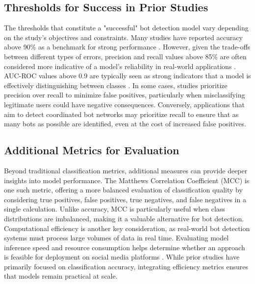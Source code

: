 \documentclass[10pt,twocolumn]{article}
\begin{document}
\subsection{Thresholds for Success in Prior Studies}
The thresholds that constitute a "successful" bot detection model vary depending on the study's objectives and constraints. Many studies have reported accuracy above 90\% as a benchmark for strong performance \cite{Akyon2019}. However, given the trade-offs between different types of errors, precision and recall values above 85\% are often considered more indicative of a model's reliability in real-world applications \cite{Grimme2018}. AUC-ROC values above 0.9 are typically seen as strong indicators that a model is effectively distinguishing between classes \cite{Orabi2020}. In some cases, studies prioritize precision over recall to minimize false positives, particularly when misclassifying legitimate users could have negative consequences. Conversely, applications that aim to detect coordinated bot networks may prioritize recall to ensure that as many bots as possible are identified, even at the cost of increased false positives.

\subsection{Additional Metrics for Evaluation}
Beyond traditional classification metrics, additional measures can provide deeper insights into model performance. The Matthews Correlation Coefficient (MCC) is one such metric, offering a more balanced evaluation of classification quality by considering true positives, false positives, true negatives, and false negatives in a single calculation. Unlike accuracy, MCC is particularly useful when class distributions are imbalanced, making it a valuable alternative for bot detection. Computational efficiency is another key consideration, as real-world bot detection systems must process large volumes of data in real time. Evaluating model inference speed and resource consumption helps determine whether an approach is feasible for deployment on social media platforms \cite{Akyon2019}. While prior studies have primarily focused on classification accuracy, integrating efficiency metrics ensures that models remain practical at scale.

\printbibliography
\end{document}
